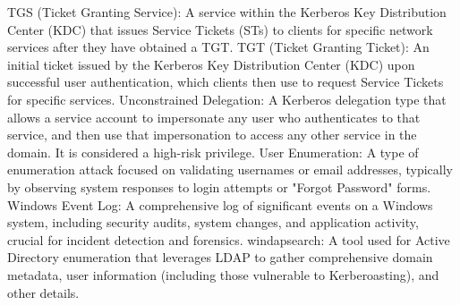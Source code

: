 TGS (Ticket Granting Service): A service within the Kerberos Key Distribution Center (KDC) that issues Service Tickets (STs) to clients for specific network services after they have obtained a TGT.
TGT (Ticket Granting Ticket): An initial ticket issued by the Kerberos Key Distribution Center (KDC) upon successful user authentication, which clients then use to request Service Tickets for specific services.
Unconstrained Delegation: A Kerberos delegation type that allows a service account to impersonate any user who authenticates to that service, and then use that impersonation to access any other service in the domain. It is considered a high-risk privilege.
User Enumeration: A type of enumeration attack focused on validating usernames or email addresses, typically by observing system responses to login attempts or "Forgot Password" forms.
Windows Event Log: A comprehensive log of significant events on a Windows system, including security audits, system changes, and application activity, crucial for incident detection and forensics.
windapsearch: A tool used for Active Directory enumeration that leverages LDAP to gather comprehensive domain metadata, user information (including those vulnerable to Kerberoasting), and other details.
